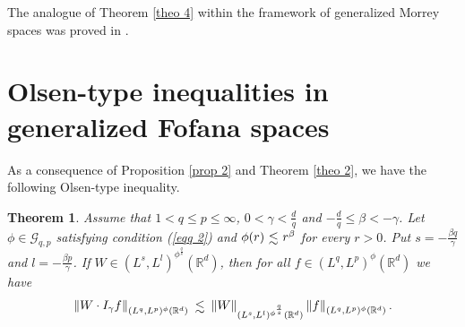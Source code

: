 \documentclass[10pt,a4paper]{amsart}
\numberwithin{equation}{section}
\newtheorem{theorem}{Theorem}[section]
\numberwithin{equation}{section}
\def\lsim{\raisebox{-1ex}{$~\stackrel{\textstyle <}{\sim}~$}}
\begin{document}
The analogue of Theorem \ref{theo 4} within the framework of generalized Morrey spaces was proved in \cite[Theorem B]{GE0}. 
\section{Olsen-type inequalities in generalized Fofana spaces}
\label{S5}
As a consequence of Proposition \ref{prop 2} and Theorem \ref{theo 2}, we have the following Olsen-type inequality.
\begin{theorem}\label{theo 5}
Assume that $1 < q\leq p \leq \infty$, $ 0 < \gamma < \frac{d}{q}$ and $-\frac{d}{q} \leq \beta  < -\gamma $. Let $\phi\in \mathcal{G}_{q,p}$ satisfying condition (\ref{eqq 2}) and $\phi(r) \lsim  r^{\beta}$ for every $r > 0$. Put $s=-\frac{\beta q}{\gamma}$ and $l=-\frac{\beta p}{\gamma}$. If $W \in (L^{s},L^{l})^{\phi^{\frac{q}{s}}}(\mathbb{R}^{d})$, 
 then for all  $f \in (L^{q},L^{p})^{\phi}(\mathbb{R}^{d})$ we have
 $$\left\Vert W \cdot I_{\gamma}f \right\Vert_{(L^{q},L^{p})^{\phi}(\mathbb{R}^{d})} \lsim \left\Vert W  \right\Vert_{(L^{s},L^{l})^{\phi^{\frac{q}{s}}}(\mathbb{R}^{d})} \left\Vert f  \right\Vert_{(L^{q},L^{p})^{\phi}(\mathbb{R}^{d})}.$$ 
\end{theorem}
\end{document}
